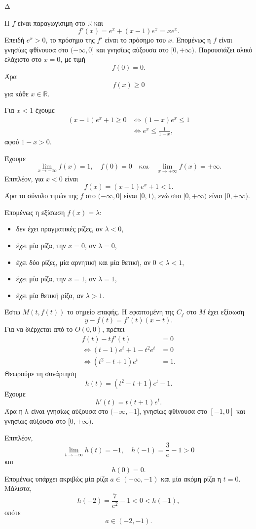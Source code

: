 \begin{thema}{Δ}
\begin{erwthma}
\item Η $f$ είναι παραγωγίσιμη στο $\mathbb{R}$ και
\[
f'(x)=e^x+(x-1)e^x=xe^x.
\]
Επειδή $e^x>0$, το πρόσημο της $f'$ είναι το πρόσημο του $x$. Επομένως η $f$ είναι γνησίως φθίνουσα στο $(-\infty,0]$ και γνησίως αύξουσα στο $[0,+\infty)$. Παρουσιάζει ολικό ελάχιστο στο $x=0$, με τιμή
\[
f(0)=0.
\]
Άρα
\[
f(x)\geq0
\]
για κάθε $x\in\mathbb{R}$.

Για $x<1$ έχουμε
\begin{align*}
(x-1)e^x+1\geq0
&\Leftrightarrow (1-x)e^x\leq1\\
&\Leftrightarrow {e^x\leq\frac{1}{1-x}},
\end{align*}
αφού $1-x>0$.

\item Έχουμε
\[
\lim_{x\to-\infty}f(x)=1,
\quad
f(0)=0
\quad\text{και}\quad
\lim_{x\to+\infty}f(x)=+\infty.
\]
Επιπλέον, για $x<0$ είναι
\[
f(x)=(x-1)e^x+1<1.
\]
Άρα το σύνολο τιμών της $f$ στο $(-\infty,0]$ είναι $[0,1)$, ενώ στο $[0,+\infty)$ είναι $[0,+\infty)$.

Επομένως η εξίσωση $f(x)=\lambda$:
\begin{itemize}
\item δεν έχει πραγματικές ρίζες, αν $\lambda<0$,
\item έχει μία ρίζα, την $x=0$, αν $\lambda=0$,
\item έχει δύο ρίζες, μία αρνητική και μία θετική, αν $0<\lambda<1$,
\item έχει μία ρίζα, την $x=1$, αν $\lambda=1$,
\item έχει μία θετική ρίζα, αν $\lambda>1$.
\end{itemize}

\item Έστω $M(t,f(t))$ το σημείο επαφής. Η εφαπτομένη της $C_f$ στο $M$ έχει εξίσωση
\[
y-f(t)=f'(t)(x-t).
\]
Για να διέρχεται από το $O(0,0)$, πρέπει
\begin{align*}
f(t)-tf'(t)&=0\\
\Leftrightarrow (t-1)e^t+1-t^2e^t&=0\\
\Leftrightarrow (t^2-t+1)e^t&=1.
\end{align*}
Θεωρούμε τη συνάρτηση
\[
h(t)=(t^2-t+1)e^t-1.
\]
Έχουμε
\[
h'(t)=t(t+1)e^t.
\]
Άρα η $h$ είναι γνησίως αύξουσα στο $(-\infty,-1]$, γνησίως φθίνουσα στο $[-1,0]$ και γνησίως αύξουσα στο $[0,+\infty)$.

Επιπλέον,
\[
\lim_{t\to-\infty}h(t)=-1,
\quad
h(-1)=\frac{3}{e}-1>0
\]
και
\[
h(0)=0.
\]
Επομένως υπάρχει ακριβώς μία ρίζα $a\in(-\infty,-1)$ και μία ακόμη ρίζα η $t=0$. Μάλιστα,
\[
h(-2)=\frac{7}{e^2}-1<0<h(-1),
\]
οπότε
\[
a\in(-2,-1).
\]


\end{erwthma}
\end{thema}
